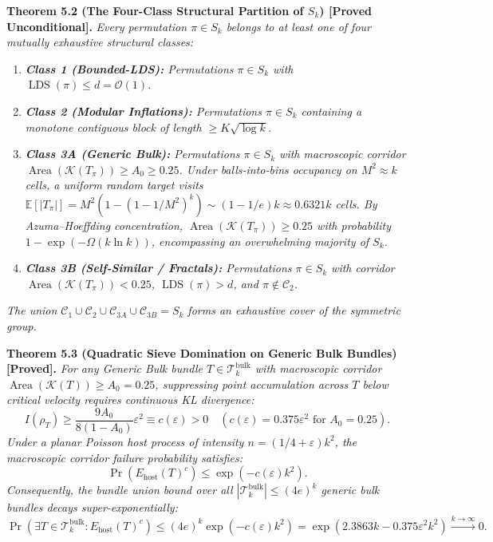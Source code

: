 \documentclass[
  11pt,
]{article}
\providecommand{\tightlist}{%
  \setlength{\itemsep}{0pt}\setlength{\parskip}{0pt}}
\begin{document}
\textbf{Theorem 5.2 (The Four-Class Structural Partition of $S_k$) [Proved Unconditional].}
\emph{Every permutation $\pi \in S_k$ belongs to at least one of four mutually exhaustive structural classes:}
\begin{enumerate}
\def\labelenumi{\arabic{enumi}.}
\tightlist
\item \emph{\textbf{Class 1 (Bounded-LDS):} Permutations $\pi \in S_k$ with $\operatorname{LDS}(\pi) \le d = \mathcal{O}(1)$.}
\item \emph{\textbf{Class 2 (Modular Inflations):} Permutations $\pi \in S_k$ containing a monotone contiguous block of length $\ge K\sqrt{\log k}$.}
\item \emph{\textbf{Class 3A (Generic Bulk):} Permutations $\pi \in S_k$ with macroscopic corridor $\operatorname{Area}(\mathcal{K}(T_\pi)) \ge A_0 \ge 0.25$. Under balls-into-bins occupancy on $M^2 \approx k$ cells, a uniform random target visits $\mathbb{E}[|T_\pi|] = M^2(1 - (1 - 1/M^2)^k) \sim (1 - 1/e)k \approx 0.6321 k$ cells. By Azuma--Hoeffding concentration, $\operatorname{Area}(\mathcal{K}(T_\pi)) \ge 0.25$ with probability $1 - \exp(-\Omega(k \ln k))$, encompassing an overwhelming majority of $S_k$.}
\item \emph{\textbf{Class 3B (Self-Similar / Fractals):} Permutations $\pi \in S_k$ with corridor $\operatorname{Area}(\mathcal{K}(T_\pi)) < 0.25$, $\operatorname{LDS}(\pi) > d$, and $\pi \notin \mathcal{C}_2$.}
\end{enumerate}
\emph{The union $\mathcal{C}_1 \cup \mathcal{C}_2 \cup \mathcal{C}_{3A} \cup \mathcal{C}_{3B} = S_k$ forms an exhaustive cover of the symmetric group.}

\textbf{Theorem 5.3 (Quadratic Sieve Domination on Generic Bulk Bundles) [Proved].}
\emph{For any Generic Bulk bundle $T \in \mathcal{T}_k^{\mathrm{bulk}}$ with macroscopic corridor $\operatorname{Area}(\mathcal{K}(T)) \ge A_0 = 0.25$, suppressing point accumulation across $T$ below critical velocity requires continuous KL divergence:}
\begin{equation}
I(\rho_T) \ge \frac{9 A_0}{8(1 - A_0)} \varepsilon^2 \equiv c(\varepsilon) > 0 \quad \left(c(\varepsilon) = 0.375 \varepsilon^2 \text{ for } A_0 = 0.25\right).
\end{equation}
\emph{Under a planar Poisson host process of intensity $n = (1/4+\varepsilon)k^2$, the macroscopic corridor failure probability satisfies:}
\begin{equation}
\Pr(E_{\mathrm{host}}(T)^c) \le \exp\left( - c(\varepsilon) k^2 \right).
\end{equation}
\emph{Consequently, the bundle union bound over all $|\mathcal{T}_k^{\mathrm{bulk}}| \le (4e)^k$ generic bulk bundles decays super-exponentially:}
\begin{equation}
\Pr\left( \exists T \in \mathcal{T}_k^{\mathrm{bulk}} : E_{\mathrm{host}}(T)^c \right) \le (4e)^k \exp\left( - c(\varepsilon) k^2 \right) = \exp\left( 2.3863 k - 0.375 \varepsilon^2 k^2 \right) \xrightarrow{k \to \infty} 0.
\end{equation}
\end{document}
